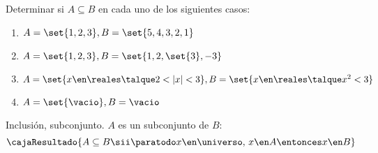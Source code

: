 \begin{enunciado}{\ejercicio}
  Determinar si $A \subseteq B$ en cada uno de los siguientes casos:
  \begin{enumerate}[label=\roman*)]
    \item $ A = \set{1, 2, 3}, B = \set{5,4,3,2,1}$
    \item $ A = \set{1, 2, 3}, B = \set{1,2,\set{3},-3}$
    \item $ A = \set{x \en \reales \talque 2< |x| <3}, B = \set{x \en \reales \talque x^2 < 3 }$
    \item $ A = \set{\vacio}, B = \vacio $
  \end{enumerate}
\end{enunciado}

Inclusión, subconjunto. $A$ es un subconjunto de $B$:
$$
  \cajaResultado{
    A \subseteq B
    \sii
    \paratodo x \en \universo,\, x \en A \entonces x \en B
  }
$$
